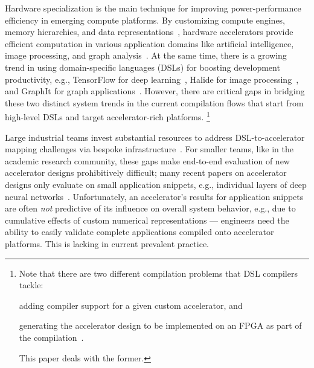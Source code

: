 Hardware specialization is the main technique for improving power-performance efficiency in emerging compute platforms. 
%
By customizing compute engines, memory hierarchies, and data representations~\cite{chan2014itrs,fang2019understanding,lai2021programming}, hardware accelerators provide efficient computation in various application domains like artificial intelligence, image processing, and graph analysis~\cite{han2016eie,chen2016eyeriss,reagen2016minerva,zhang2016cambricon,hameed2010understanding,ham2016graphicionado}.
%
At the same time, there is a growing trend in using domain-specific languages (DSLs) for boosting development productivity, e.g., TensorFlow for deep learning~\cite{abadi2016tensorflow}, Halide for image processing~\cite{ragan2013halide}, and GraphIt for graph applications~\cite{zhang2018graphit}.
%
However, there are critical gaps in bridging these two distinct system trends in the current compilation flows that start from high-level DSLs and target accelerator-rich platforms.%
\footnote{
  Note that there are two different compilation problems that DSL compilers tackle: 
  \begin{inlinelist}
    \item adding compiler support for a given custom accelerator, and 
    \item generating the accelerator design to be implemented on an FPGA as part of the compilation~\cite{noronha2018leflow,lai2019heterocl,skalicky2018hot,wang2021autosa,hegarty2014darkroom,cfuplayground}.
  \end{inlinelist}
  This paper deals with the former. %
}

%
Large industrial teams invest substantial resources to address DSL-to-accelerator mapping challenges via bespoke infrastructure~\cite{jouppi2017datacenter, jouppi2020tpu}.
%
For smaller teams, like in the academic research community, these gaps make end-to-end evaluation of new accelerator designs prohibitively difficult;
%
many recent papers on accelerator designs only evaluate on small application snippets, e.g., individual layers of deep neural networks~\cite{tambe20219,jia202031,park20219,rossi20214,schmidt20214,whatmough201916nm,fujii2018new,cao202065nm,giordano2021chimera,saito2021analog,wei2019overcoming, garofalo20211}.
%
Unfortunately, an accelerator's results for application snippets are often \textit{not} predictive of its  influence on overall system behavior, e.g., due to cumulative effects of custom numerical representations --- %
engineers need the ability to easily validate complete applications compiled onto accelerator platforms. This is lacking in current prevalent practice.

